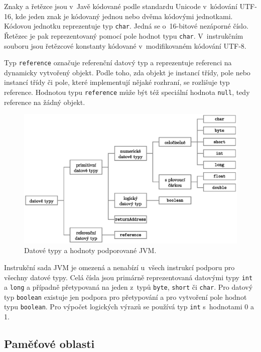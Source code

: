 Znaky a řetězce jsou v~Javě kódované podle standardu Unicode v~kódování UTF-16, kde jeden znak je kódovaný jednou nebo dvěma kódovými jednotkami. Kódovou jednotku reprezentuje typ \texttt{char}. Jedná se o~16-bitové nezáporné číslo. Řetězec je pak reprezentovaný pomocí pole hodnot typu \texttt{char}. V~instrukčním souboru jsou řetězcové konstanty kódované v~modifikovaném kódování UTF-8. 

Typ \texttt{reference} označuje referenční datový typ a reprezentuje referenci na dynamicky vytvořený objekt. Podle toho, zda objekt je instancí třídy, pole nebo instancí třídy či pole, které implementují nějaké rozhraní, se rozlišuje typ reference. Hodnotou typu \texttt{reference} může být též speciální hodnota \texttt{null}, tedy reference na žádný objekt. 

\begin{figure}[!h]
\centering
\includegraphics[scale=0.8]{fig/types}
\caption{Datové typy a hodnoty podporované JVM.}\label{fig:types}
\end{figure}

Instrukční sada JVM je omezená a nenabízí u~všech instrukcí podporu pro všechny datové typy. Celá čísla jsou primárně reprezentovaná datovými typy \texttt{int} a \texttt{long} a případně přetypovaná na jeden z~typů \texttt{byte}, \texttt{short} či \texttt{char}. Pro datový typ \texttt{boolean} existuje jen podpora pro přetypování a pro vytvoření pole hodnot typu \texttt{boolean}. Pro výpočet logických výrazů se používá typ \texttt{int} s~hodnotami 0 a 1.


\subsection{Paměťové oblasti}

